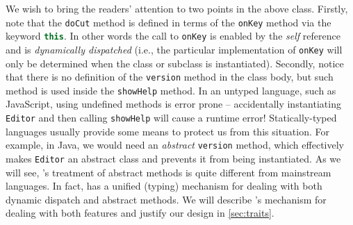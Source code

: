 We wish to bring the readers' attention to two points in the above class.
Firstly, note that the \lstinline{doCut} method is defined in terms of the
\lstinline{onKey} method via the keyword
\lstinline[language=JavaScript]{this}. In other words the call to
\lstinline{onKey} is enabled by the \emph{self} reference and is
\emph{dynamically dispatched} (i.e., the particular implementation of
\lstinline{onKey} will only be determined when the class or subclass
is instantiated). %
Secondly, notice that there is no definition of
the \lstinline{version} method in the class body, but such method is used inside the
\lstinline{showHelp} method. In an untyped language, such as JavaScript, using
undefined methods is error prone -- accidentally instantiating \lstinline{Editor}
and then calling \lstinline{showHelp} will cause a runtime error!
Statically-typed languages usually provide some means to protect us from this
situation. For example, in Java, we would need an \textit{abstract} \lstinline{version}
method, which effectively makes \lstinline{Editor} an abstract class and
prevents it from being instantiated. As we will see, \sedel's treatment of
abstract methods is quite different from mainstream languages. In fact, \sedel
has a unified (typing) mechanism for dealing with both dynamic dispatch and abstract
methods. We will describe \sedel's mechanism for dealing with both features and
justify our design in \cref{sec:traits}.


